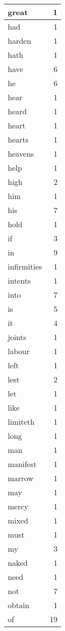 \begin{center}
\begin{longtable}{l|r}
great & 1\\ \hline 
had & 1\\ \hline 
harden & 1\\ \hline 
hath & 1\\ \hline 
have & 6\\ \hline 
he & 6\\ \hline 
hear & 1\\ \hline 
heard & 1\\ \hline 
heart & 1\\ \hline 
hearts & 1\\ \hline 
heavens & 1\\ \hline 
help & 1\\ \hline 
high & 2\\ \hline 
him & 1\\ \hline 
his & 7\\ \hline 
hold & 1\\ \hline 
if & 3\\ \hline 
in & 9\\ \hline 
infirmities & 1\\ \hline 
intents & 1\\ \hline 
into & 7\\ \hline 
is & 5\\ \hline 
it & 4\\ \hline 
joints & 1\\ \hline 
labour & 1\\ \hline 
left & 1\\ \hline 
lest & 2\\ \hline 
let & 1\\ \hline 
like & 1\\ \hline 
limiteth & 1\\ \hline 
long & 1\\ \hline 
man & 1\\ \hline 
manifest & 1\\ \hline 
marrow & 1\\ \hline 
may & 1\\ \hline 
mercy & 1\\ \hline 
mixed & 1\\ \hline 
must & 1\\ \hline 
my & 3\\ \hline 
naked & 1\\ \hline 
need & 1\\ \hline 
not & 7\\ \hline 
obtain & 1\\ \hline 
of & 19\\ \hline 

\end{longtable}
\end{center}
